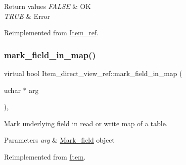 \begin{DoxyRetVals}{Return values}
{\em F\+A\+L\+SE} & OK \\
\hline
{\em T\+R\+UE} & Error \\
\hline
\end{DoxyRetVals}


Reimplemented from \mbox{\hyperlink{classItem__ref_a6a78e05b0db89e799f61808c621b808f}{Item\+\_\+ref}}.

\mbox{\label{classItem__direct__view__ref_a82d411e16d677c1a1eead5c386f6bdd0}} 
\subsubsection{\texorpdfstring{mark\+\_\+field\+\_\+in\+\_\+map()}{mark\_field\_in\_map()}}
{\footnotesize\ttfamily virtual bool Item\+\_\+direct\+\_\+view\+\_\+ref\+::mark\+\_\+field\+\_\+in\+\_\+map (\begin{DoxyParamCaption}\item[{uchar $\ast$}]{arg }\end{DoxyParamCaption})\hspace{0.3cm}{\ttfamily [inline]}, {\ttfamily [virtual]}}

Mark underlying field in read or write map of a table.


\begin{DoxyParams}{Parameters}
{\em arg} & \mbox{\hyperlink{classMark__field}{Mark\+\_\+field}} object \\
\hline
\end{DoxyParams}


Reimplemented from \mbox{\hyperlink{classItem_ada2ce79ccf5ef1273b9e1654448944c1}{Item}}.

\mbox{\label{classItem__direct__view__ref_ac1cdb42acbcec19d8d004f86f96d8db8}} 
